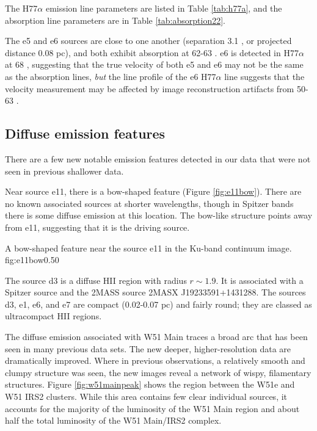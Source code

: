 The H77$\alpha$ emission line parameters are listed in Table \ref{tab:h77a}, and
the \para \twotwo absorption line parameters are in Table \ref{tab:absorption22}.

The e5 and e6 sources are close to one another (separation 3.1 \arcsec, or
projected distance 0.08 pc), and both exhibit \formaldehyde absorption at 62-63
\kms.  e6 is detected in H77$\alpha$ at 68 \kms, suggesting that the true
velocity of both e5 and e6 may not be the same as the \formaldehyde absorption
lines, \emph{but} the line profile of the e6 H77$\alpha$ line suggests that the
velocity measurement may be affected by image reconstruction artifacts from
50-63 \kms.





\subsection{Diffuse emission features}
\label{sec:diffuseemission}
There are a few new notable emission features detected in our data that were
not seen in previous shallower data.

Near source e11, there is a bow-shaped feature (Figure \ref{fig:e11bow}).
There are no known associated sources at shorter wavelengths, though in Spitzer
bands there is some diffuse emission at this location.  The bow-like structure
points away from e11, suggesting that it is the driving source.

{A bow-shaped feature near the source e11 in the Ku-band continuum image.}
{fig:e11bow}{0.5}{0}

The source d3 is a diffuse HII region with radius $r\sim1.9$\arcsec.  It is
associated with a Spitzer source and the 2MASS source 2MASX J19233591+1431288.
The sources d3, e1, e6, and e7 are compact (0.02-0.07 pc) and fairly round;
they are classed as ultracompact HII regions.

The diffuse emission associated with W51 Main traces a broad arc that has been
seen in many previous data sets.  The new deeper, higher-resolution data are
dramatically improved.  Where in previous observations, a relatively smooth and
clumpy structure was seen, the new images reveal a network of wispy,
filamentary structures.  Figure \ref{fig:w51mainpeak} shows the region between
the W51e and W51 IRS2 clusters.  While this area contains few clear individual
sources, it accounts for the majority of the luminosity of the W51 Main region
and about half the total luminosity of the W51 Main/IRS2 complex.  

